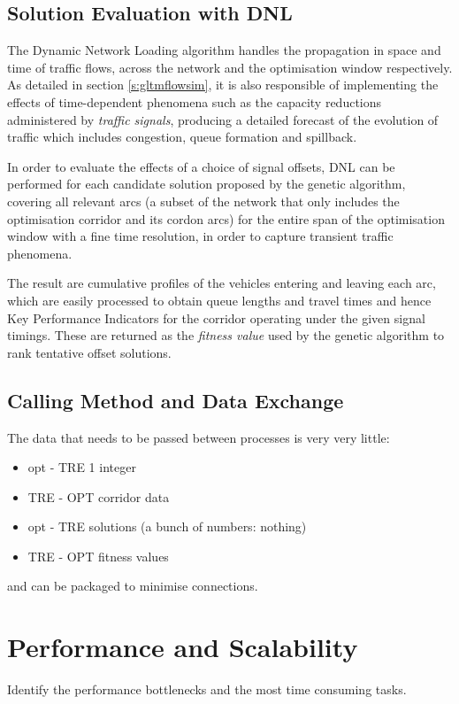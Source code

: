 \subsection{Solution Evaluation with DNL}
The Dynamic Network Loading algorithm handles the propagation in space and time of traffic flows, across the network and the optimisation window respectively. As detailed in section \ref{s:gltmflowsim}, it is also responsible of implementing the effects of time-dependent phenomena such as the capacity reductions administered by \emph{traffic signals}, producing a detailed forecast of the evolution of traffic which includes congestion, queue formation and spillback.

In order to evaluate the effects of a choice of signal offsets, DNL can be performed for each candidate solution proposed by the genetic algorithm, covering all relevant arcs (a subset of the network that only includes the optimisation corridor and its cordon arcs) for the entire span of the optimisation window with a fine time resolution, in order to capture transient traffic phenomena.

The result are cumulative profiles of the vehicles entering and leaving each arc, which are easily processed to obtain queue lengths and travel times and hence Key Performance Indicators for the corridor operating under the given signal timings. These are returned as the \emph{fitness value} used by the genetic algorithm to rank tentative offset solutions.

\subsection{Calling Method and Data Exchange}
The data that needs to be passed between processes is very very little:
\begin{itemize}
\item opt - TRE 1 integer
\item TRE - OPT corridor data
\item opt - TRE solutions (a bunch of numbers: nothing)
\item TRE - OPT fitness values
\end{itemize}
and can be packaged to minimise connections.

\section{Performance and Scalability}
Identify the performance bottlenecks and the most time consuming tasks.

